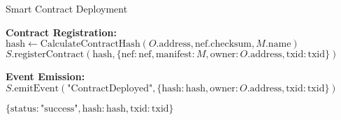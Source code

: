 \begin{tcolorbox}
\begin{protocol}{Smart Contract Deployment}
\begin{algorithmic}[1]
\State \textbf{Contract Registration:}
\State $\text{hash} \gets \text{CalculateContractHash}(O.\text{address}, \text{nef}.\text{checksum}, M.\text{name})$
\State $S.\text{registerContract}(\text{hash}, \{\text{nef}: \text{nef}, \text{manifest}: M, \text{owner}: O.\text{address}, \text{txid}: \text{txid}\})$

\State \textbf{Event Emission:}
\State $S.\text{emitEvent}(\text{"ContractDeployed"}, \{\text{hash}: \text{hash}, \text{owner}: O.\text{address}, \text{txid}: \text{txid}\})$

\State \Return $\{\text{status}: \text{"success"}, \text{hash}: \text{hash}, \text{txid}: \text{txid}\}$
\end{algorithmic}
\end{protocol}
\end{tcolorbox}

